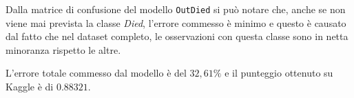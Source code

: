 Dalla matrice di confusione del modello \texttt{OutDied} si può notare che, anche se non viene mai prevista la classe \textit{Died}, l'errore commesso è minimo e questo è causato dal fatto che nel dataset completo, le osservazioni con questa classe sono in netta minoranza rispetto le altre.

L'errore totale commesso dal modello è del $32,61\%$ e il punteggio ottenuto su Kaggle è di $0.88321$.

\begin{table}[htbp]
\centering
{}\hspace{1cm}
\end{table}
